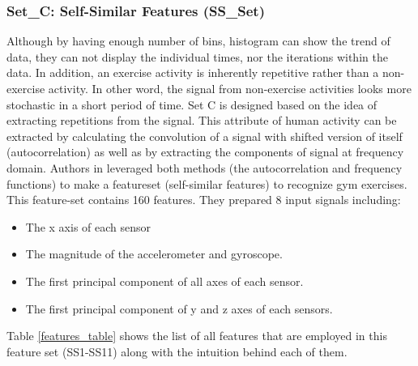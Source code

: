 \documentclass[journal,article,submit,moreauthors,pdftex]{Definitions/mdpi}
\newcommand{\hosein}[1]{\textcolor{orange}{{\it [Hosein: #1]}}}
\begin{document}
\subsubsection{Set\_C: Self-Similar Features (SS\_Set)}
Although by having enough number of bins, histogram can show the trend of data, they can not display the individual times, nor the iterations within the data. In addition, an exercise activity is inherently repetitive rather than a non-exercise activity. In other word, the signal from non-exercise activities looks more stochastic in a short period of time. Set C is designed based on the idea of extracting repetitions from the signal. This attribute of human activity can be extracted by calculating the convolution of a signal with shifted version of itself (autocorrelation) as well as by extracting the components of signal at frequency domain. Authors in \cite{morris2014recofit} leveraged both methods (the autocorrelation and frequency functions) to make a featureset (self-similar features) to recognize gym exercises. This feature-set contains 160 features. They prepared 8 input signals including: 
\begin{itemize}
	\item The x axis of each sensor\\
	\item The magnitude of the accelerometer and gyroscope. \\
	\item The first principal component of all axes of each sensor.\\
	\item The first principal component of y and z axes of each sensors.\\
\end{itemize}
Table \ref{features_table} shows the list of all features that are employed in this feature set (SS1-SS11) along with the intuition behind each of them.
\end{document}
